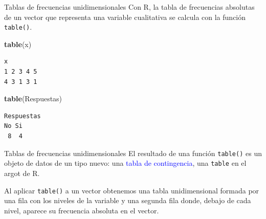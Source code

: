 \documentclass[
  ignorenonframetext,
  aspectratio=169]{beamer}
\newenvironment{Shaded}{\begin{snugshade}}{\end{snugshade}}
\newcommand{\FunctionTok}[1]{\textcolor[rgb]{0.13,0.29,0.53}{\textbf{#1}}}
\newcommand{\NormalTok}[1]{#1}
\newcommand\blue[1]{\textcolor{blue}{#1}}
\begin{document}
\begin{frame}[fragile]{Tablas de frecuencias unidimensionales}
\label{tablas-de-frecuencias-unidimensionales-1}
Con R, la tabla de frecuencias absolutas de un vector que representa una
variable cualitativa se calcula con la función \texttt{table()}.

\begin{Shaded}
\begin{Highlighting}[]
\FunctionTok{table}\NormalTok{(x)}
\end{Highlighting}
\end{Shaded}

\begin{verbatim}
x
1 2 3 4 5 
4 3 1 3 1 
\end{verbatim}

\begin{Shaded}
\begin{Highlighting}[]
\FunctionTok{table}\NormalTok{(Respuestas)}
\end{Highlighting}
\end{Shaded}

\begin{verbatim}
Respuestas
No Si 
 8  4 
\end{verbatim}
\end{frame}

\begin{frame}[fragile]{Tablas de frecuencias unidimensionales}
\label{tablas-de-frecuencias-unidimensionales-2}
El resultado de una función \texttt{table()} es un objeto de datos de un
tipo nuevo: una \blue{tabla de contingencia}, una \texttt{table} en el
argot de R.

Al aplicar \texttt{table()} a un vector obtenemos una tabla
unidimensional formada por una fila con los niveles de la variable y una
segunda fila donde, debajo de cada nivel, aparece su frecuencia absoluta
en el vector.
\end{frame}
\end{document}
